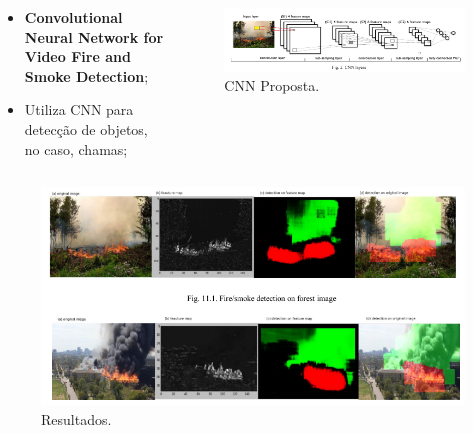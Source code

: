 \documentclass{beamer}
\begin{document}
\begin{frame}{}
\begin{columns}
    \begin{column}{0.40\textwidth}
		\begin{itemize}
			\item \textbf{Convolutional Neural Network for Video Fire and Smoke Detection};
			\item Utiliza CNN para detecção de objetos, no caso, chamas;
		\end{itemize}
    \end{column}

    \begin{column}{0.6\textwidth}
		\begin{figure}[H]
		    \centering
		    \begin{center}
		    \includegraphics[width=\textwidth]{img/fig2-artigo8.png}
		  \caption{CNN Proposta.}
		    \label{fig:sar}
		  \end{center}
		\end{figure}
    \end{column}
\end{columns}
\end{frame}


\begin{frame}{}
	\begin{figure}[H]
		\centering
		\begin{center}
		\includegraphics[width=\textwidth]{img/resultados-artigo8.png}
		\caption{Resultados.}
		\label{fig:sar}
		\end{center}
	\end{figure}
\end{frame}
\end{document}
